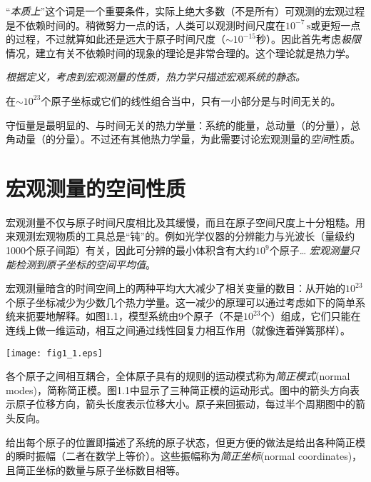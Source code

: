 “{\it 本质上}”这个词是一个重要条件，实际上绝大多数（不是所有）可观测的宏观过程是不依赖时间的。稍微努力一点的话，人类可以观测时间尺度在$10^{-7}\, \mathrm{s}$或更短一点的过程，不过就算如此还是远大于原子时间尺度（$\sim 10^{-15}$秒）。因此首先考虑{\it 极限}情况，建立有关不依赖时间的现象的理论是非常合理的。这个理论就是热力学。

{\it 根据定义，考虑到宏观测量的性质，热力学只描述宏观系统的静态。}

在$\sim 10^{23}$个原子坐标或它们的线性组合当中，只有一小部分是与时间无关的。

守恒量是最明显的、与时间无关的热力学量：系统的能量，总动量（的分量），总角动量（的分量）。不过还有其他热力学量，为此需要讨论宏观测量的{\it 空间}性质。

\section{宏观测量的空间性质}
\label{sec1.2}
宏观测量不仅与原子时间尺度相比及其缓慢，而且在原子空间尺度上十分粗糙。用来观测宏观物质的工具总是“钝”的。例如光学仪器的分辨能力与光波长（量级约1000个原子间距）有关，因此可分辨的最小体积含有大约$10^9$个原子… {\it 宏观测量只能检测到原子坐标的空间平均值}。

宏观测量暗含的时间空间上的两种平均大大减少了相关变量的数目：从开始的$10^{23}$个原子坐标减少为少数几个热力学量。这一减少的原理可以通过考虑如下的简单系统来扼要地解释。如图1.1，模型系统由9个原子（不是$10^{23}$个）组成，它们只能在连线上做一维运动，相互之间通过线性回复力相互作用（就像连着弹簧那样）。

{
	\centering
	\texttt{[image: fig1\_1.eps]} 
}

各个原子之间相互耦合，全体原子具有的规则的运动模式称为{\it 简正模式}(normal modes)，简称简正模。图1.1中显示了三种简正模的运动形式。图中的箭头方向表示原子位移方向，箭头长度表示位移大小。原子来回振动，每过半个周期图中的箭头反向。

给出每个原子的位置即描述了系统的原子状态，但更方便的做法是给出各种简正模的瞬时振幅（二者在数学上等价）。这些振幅称为{\it 简正坐标}(normal coordinates)，且简正坐标的数量与原子坐标数目相等。

